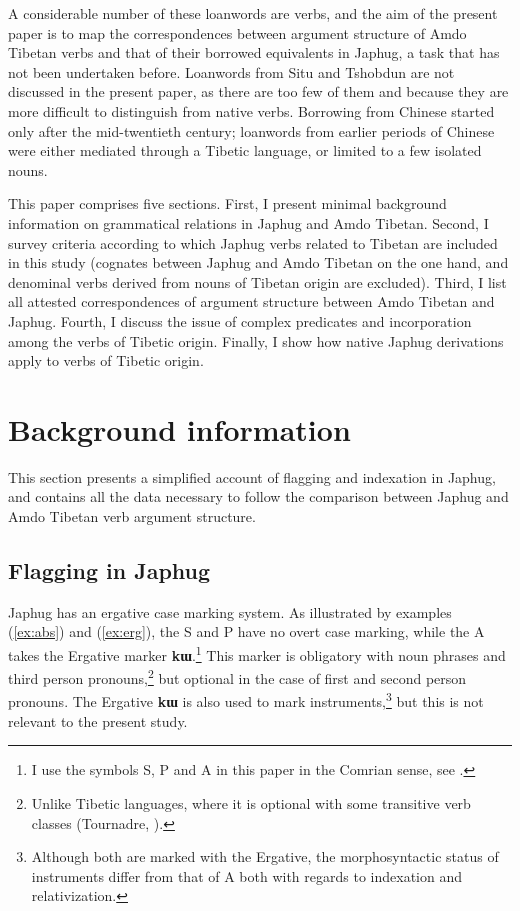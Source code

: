 \documentclass[oneside,a4paper,11pt]{article}
\newcommand{\ipa}[1]{{\phon\textbf{\mbox{#1}}}} %
\newcommand{\refb}[1]{(\ref{#1})}
\begin{document}
A considerable number of these loanwords are verbs, and the aim of the present paper is to map the correspondences between argument structure of Amdo Tibetan verbs and that of their borrowed equivalents in Japhug, a task that has not been undertaken before. Loanwords from Situ and Tshobdun are not discussed in the present paper, as there are too few of them and because they are more difficult to distinguish from native verbs. Borrowing from Chinese started only after the mid-twentieth century; loanwords from earlier periods of Chinese were either mediated through a Tibetic language, or limited to a few isolated nouns.

This paper comprises five sections. First, I present minimal background information on grammatical relations in Japhug and Amdo Tibetan. Second, I survey criteria according to which Japhug verbs related to Tibetan are included in this study (cognates between Japhug and Amdo Tibetan on the one hand, and denominal verbs derived from nouns of Tibetan origin are excluded). Third, I list all attested correspondences of argument structure between Amdo Tibetan and Japhug. Fourth, I discuss the issue of complex predicates and incorporation among the verbs of Tibetic origin. Finally, I show how native Japhug derivations apply to verbs of Tibetic origin.

\section{Background information}
This section presents a simplified account of flagging and indexation in Japhug, and contains all the data necessary to follow the comparison between Japhug and Amdo Tibetan verb argument structure.

\subsection{Flagging in Japhug}
Japhug has an ergative case marking system. As illustrated by examples \refb{ex:abs} and \refb{ex:erg}, the S and P have no overt case marking, while the A takes the Ergative marker \ipa{kɯ}.\footnote{I use the symbols S, P and A in this paper in the Comrian sense, see \citet{haspelmath11SAPTR}.} This marker is obligatory with noun phrases and third person pronouns,\footnote{Unlike Tibetic languages, where it is optional with some transitive verb classes (Tournadre, \citeyear{tournadre91}).} but optional in the case of first and second person pronouns.  The Ergative \ipa{kɯ} is also used to mark instruments,\footnote{Although both are marked with the Ergative, the morphosyntactic status of instruments differ from that of A both with regards to indexation and relativization.} but this is not relevant to the present study.
\end{document}
